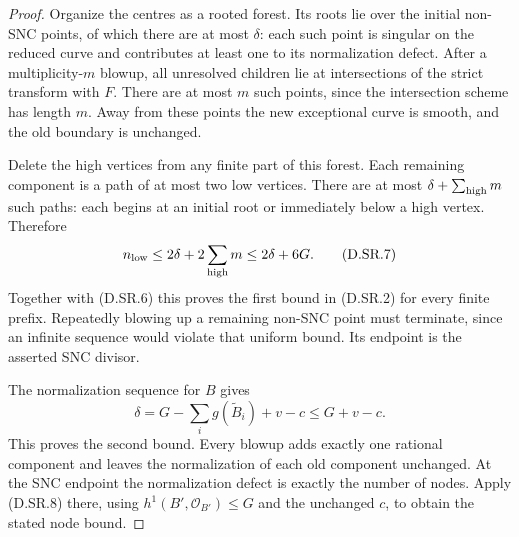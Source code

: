 \begin{proof}
Organize the centres as a rooted forest. Its roots lie over
the initial non-SNC points, of which there are at most
$\delta$: each such point is singular on the reduced curve
and contributes at least one to its normalization defect.
After a multiplicity-$m$ blowup, all unresolved children
lie at intersections of the strict transform with $F$.
There are at most $m$ such points, since the intersection
scheme has length $m$. Away from these points the new
exceptional curve is smooth, and the old boundary is unchanged.

Delete the high vertices from any finite part of this forest.
Each remaining component is a path of at most two low vertices.
There are at most $\delta+\sum_{\rm high}m$ such paths:
each begins at an initial root or immediately below a high
vertex. Therefore
\[
 n_{\rm low}\le2\delta+2\sum_{\rm high}m
                   \le2\delta+6G.                     \tag{D.SR.7}
\]
Together with (D.SR.6) this proves the first bound in
(D.SR.2) for every finite prefix. Repeatedly blowing up
a remaining non-SNC point must terminate, since an infinite
sequence would violate that uniform bound. Its endpoint
is the asserted SNC divisor.

The normalization sequence for $B$ gives
\[
 \delta=G-\sum_i g(\widetilde B_i)+v-c\le G+v-c.       \tag{D.SR.8}
\]
This proves the second bound. Every blowup adds exactly one
rational component and leaves the normalization of each old
component unchanged. At the SNC endpoint the normalization
defect is exactly the number of nodes. Apply (D.SR.8) there,
using $h^1(B',\mathcal O_{B'})\le G$ and the unchanged $c$,
to obtain the stated node bound.
\end{proof}

